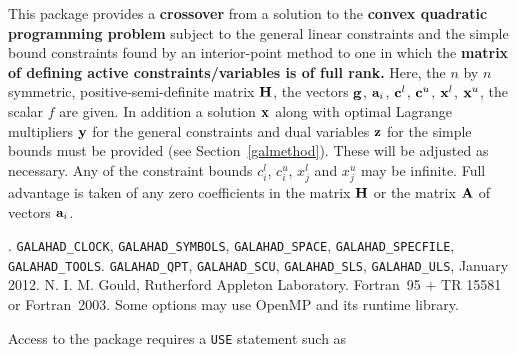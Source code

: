 \documentclass{galahad}
\newcommand{\packagename}{CRO}
\newcommand{\fullpackagename}{\libraryname\_\packagename}
\begin{document}
\galheader


\galsummary
This package provides a {\bf crossover} from a solution
to the {\bf convex quadratic programming problem}
subject to the general linear constraints
and the simple bound constraints
found by an interior-point method to one in which the
{\bf matrix of defining
active constraints/variables is of full rank.}
Here, the $n$ by $n$ symmetric, positive-semi-definite matrix ${\mathbf{H}}$, the
vectors ${\mathbf{g}}$, ${\mathbf{a}}_{i}$, ${\mathbf{c}}^{l}$, ${\mathbf{c}}^{u}$, ${\mathbf{x}}^{l}$,
${\mathbf{x}}^{u}$, the scalar $f$ are given. In addition a solution ${\mathbf{x}}$ along
with optimal Lagrange multipliers ${\mathbf{y}}$ for the general constraints
and dual variables ${\mathbf{z}}$ for the simple bounds must be provided
(see Section~\ref{galmethod}).
These will be adjusted as necessary.
Any of the constraint bounds $c_{i}^{l}$, $c_{i}^{u}$,
$x_{j}^{l}$ and $x_{j}^{u}$ may be infinite.
Full advantage is taken of any zero coefficients in the matrix ${\mathbf{H}}$
or the matrix ${\mathbf{A}}$ of vectors ${\mathbf{a}}_{i}$.


\galattributes
\galversions{\tt  \fullpackagename\_single, \fullpackagename\_double}.
\galuses
{\tt GALAHAD\_CLOCK},
{\tt GALAHAD\_SY\-M\-BOLS},
{\tt GALAHAD\-\_SPACE},
{\tt GALAHAD\_\-SPECFILE},
{\tt GALAHAD\_TOOLS}.
{\tt GALAHAD\_QPT},
{\tt GALAHAD\_\-SCU},
{\tt GALAHAD\_\-SLS},
{\tt GALAHAD\_\-ULS},
\galdate January 2012.
\galorigin N. I. M. Gould, Rutherford Appleton Laboratory.
\gallanguage Fortran~95 + TR 15581 or Fortran~2003.
\galparallelism Some options may use OpenMP and its runtime library.


\galhowto


Access to the package requires a {\tt USE} statement such as

\medskip{}
\end{document}
